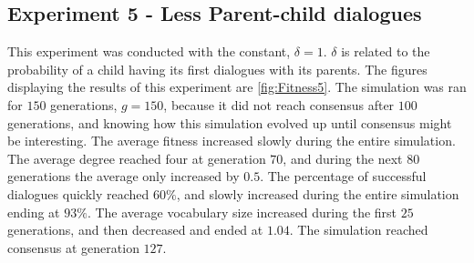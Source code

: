 \subsection{Experiment 5 - Less Parent-child dialogues}
This experiment was conducted with the constant, $\delta = 1$. $\delta$ is related to the probability of a child having its first dialogues with its parents. The figures displaying the results of this experiment are \ref{fig:Fitness5}. The simulation was ran for $150$ generations, $g = 150$, because it did not reach consensus after $100$ generations, and knowing how this simulation evolved up until consensus might be interesting. The average fitness increased slowly during the entire simulation. The average degree reached four at generation $70$, and during the next $80$ generations the average only increased by $0.5$. The percentage of successful dialogues quickly reached $60\%$, and slowly increased during the entire simulation ending at $93\%$. The average vocabulary size increased during the first $25$ generations, and then decreased and ended at $1.04$. The simulation reached consensus at generation $127$.

